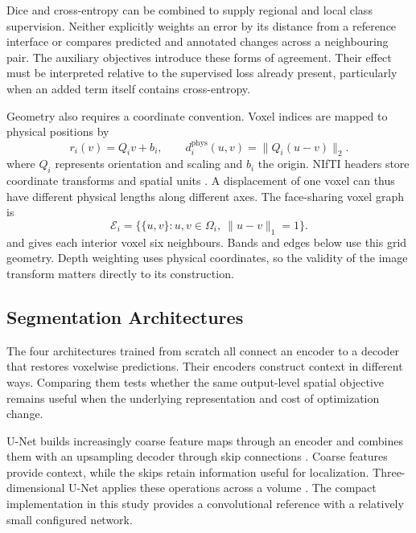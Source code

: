 \documentclass[12pt,a4paper]{article}
\begin{document}
Dice and cross-entropy can be combined to supply regional and local class
supervision. Neither explicitly weights an error by its distance from a
reference interface or compares predicted and annotated changes across
a neighbouring pair. The auxiliary objectives introduce these forms of
agreement. Their effect must be interpreted relative to the supervised
loss already present, particularly when an added term itself contains
cross-entropy.

Geometry also requires a coordinate convention. Voxel indices are mapped
to physical positions by
\begin{equation}
r_i(v)=Q_i v+b_i,
\qquad
d_i^{\mathrm{phys}}(u,v)=\lVert Q_i(u-v)\rVert_2.
\label{eq:physical-coordinates}
\end{equation}
where $Q_i$ represents orientation and scaling and $b_i$ the origin.
NIfTI headers store coordinate transforms and spatial units
\cite{nifti1fields}. A displacement of one voxel can thus have different
physical lengths along different axes. The face-sharing voxel graph is
\begin{equation}
\mathcal{E}_i=\{\{u,v\}:u,v\in\Omega_i,\ \lVert u-v\rVert_1=1\}.
\label{eq:voxel-neighbourhood}
\end{equation}
and gives each interior voxel six neighbours. Bands and edges below use
this grid geometry. Depth weighting uses physical coordinates, so the
validity of the image transform matters directly to its construction.

\subsection{Segmentation Architectures}\label{sec:segmentation-architectures}

The four architectures trained from scratch all connect an encoder to a
decoder that restores voxelwise predictions. Their encoders construct
context in different ways. Comparing them tests whether the same
output-level spatial objective remains useful when the underlying
representation and cost of optimization change.

U-Net builds increasingly coarse feature maps through an encoder and
combines them with an upsampling decoder through skip connections
\cite{ronneberger2015unet}. Coarse features provide context, while the
skips retain information useful for localization. Three-dimensional
U-Net applies these operations across a volume \cite{cicek2016unet}.
The compact implementation in this study provides a convolutional
reference with a relatively small configured network.
\end{document}

